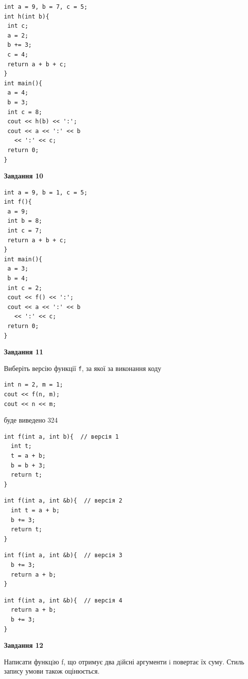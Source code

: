 \documentclass[12pt, ukrainian]{article}
\def\code#1{\Verb!#1!}
\begin{document}
{\begin {large}
\begin{minipage}[t]{7.0cm}
\begin{verbatim}
int a = 9, b = 7, c = 5;
int h(int b){
 int c;
 a = 2;
 b += 3;
 c = 4;
 return a + b + c;
}
int main(){
 a = 4;
 b = 3;
 int c = 8;
 cout << h(b) << ':';
 cout << a << ':' << b 
   << ':' << c;
 return 0;
}
\end{verbatim}



\begin{center}
\textbf{Завдання 10}
\end{center}
\vspace{-8mm}

\begin{verbatim}
int a = 9, b = 1, c = 5;
int f(){
 a = 9;
 int b = 8;
 int c = 7;
 return a + b + c;
}
int main(){
 a = 3;
 b = 4;
 int c = 2;
 cout << f() << ':';
 cout << a << ':' << b 
   << ':' << c;
 return 0;
}
\end{verbatim}

\end{minipage}
\vline \hspace{1mm}
\begin{minipage}[t]{11.0cm}

\begin{center}
\textbf{Завдання 11}
\end{center}
Виберіть версію функції \code{f}, за якої за виконання коду
\begin{verbatim}
int n = 2, m = 1;
cout << f(n, m);
cout << n << m;
\end{verbatim}

буде виведено 324

\begin{verbatim}
int f(int a, int b){  // версія 1
  int t;
  t = a + b;
  b = b + 3;
  return t;
}
\end{verbatim}

\vspace{-8mm}\begin{verbatim}
int f(int a, int &b){  // версія 2
  int t = a + b;
  b += 3;
  return t;
}
\end{verbatim}

\vspace{-8mm}\begin{verbatim}
int f(int a, int &b){  // версія 3
  b += 3;
  return a + b;
}
\end{verbatim}

\vspace{-8mm}\begin{verbatim}
int f(int a, int &b){  // версія 4
  return a + b;
  b += 3;
}
\end{verbatim}



\begin{center}
\textbf{Завдання 12}
\end{center}

Написати функцiю f, що отримує два дiйсні аргументи i повертає їх суму. Стиль запису умови також оцінюється.\par

\end{minipage}

\end {large}}
\newpage
\end{document}

